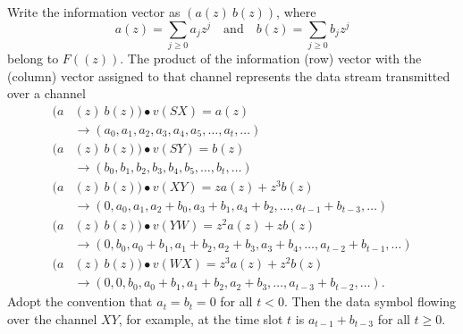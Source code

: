 \documentclass[journal]{IEEEtran}
\begin{document}
\par
Write the information vector as $(a(z)\ b(z))$, where
$$a(z)=\sum_{j\geq 0}a_jz^j\quad \text{and}\quad b(z)=\sum_{j\geq 0}b_jz^j$$
belong to $F((z))$. The product of the information (row) vector with the (column) vector assigned to that channel represents the data stream transmitted over a channel
\begin{align*}
(a & (z)\ b(z))\bullet v(SX)=a(z)\\
	& \rightarrow (a_0, a_1, a_2, a_3, a_4, a_5, \dots, a_t, \dots)\\
(a & (z)\ b(z))\bullet v(SY)=b(z)\\
	& \rightarrow (b_0, b_1, b_2, b_3, b_4, b_5, \dots, b_t, \dots)\\
(a & (z)\ b(z))\bullet v(XY)=za(z)+z^3b(z)\\
	& \rightarrow (0, a_0, a_1, a_2+b_0, a_3+b_1, a_4+b_2, \dots, a_{t-1}+b_{t-3}, \dots)\\
(a & (z)\ b(z))\bullet v(YW)=z^2a(z)+zb(z)\\
	& \rightarrow (0, b_0, a_0+b_1, a_1+b_2, a_2+b_3, a_3+b_4, \dots, a_{t-2}+b_{t-1}, \dots)\\
(a & (z)\ b(z))\bullet v(WX)=z^3a(z)+z^2b(z)\\
	& \rightarrow (0, 0, b_0, a_0+b_1, a_1+b_2, a_2+b_3, \dots, a_{t-3}+b_{t-2}, \dots).
\end{align*}
Adopt the convention that $a_t=b_t=0$ for all $t<0$. Then the data symbol flowing over the channel $XY$, for example, at the time slot $t$ is $a_{t-1}+b_{t-3}$ for all $t\geq 0$.
\end{document}
